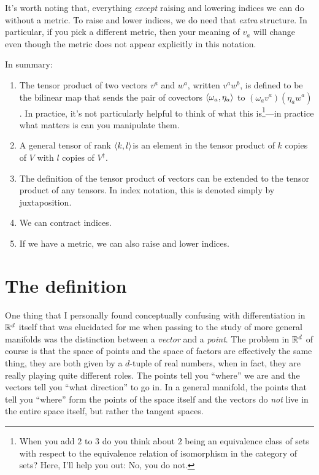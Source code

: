 It's worth noting that, everything \emph{except} raising and lowering indices we can do without a metric.  To raise and lower indices, we do need that \emph{extra} structure.  In particular, if you pick a different metric, then your meaning of $v_a$ will change even though the metric does not appear explicitly in this notation.

In summary:
\begin{enumerate}
\item The tensor product of two vectors $v^a$ and $w^a$, written $v^aw^b$, is defined to be the bilinear map that sends the pair of covectors $\langle\omega _a,\eta _a\rangle$ to $(\omega _av^a)(\eta _aw^a)$.  In practice, it's not particularly helpful to think of what this is\footnote{When you add $2$ to $3$ do you think about $2$ being an equivalence class of sets with respect to the equivalence relation of isomorphism in the category of sets?  Here, I'll help you out:  No, you do not.}---in practice what matters is can you manipulate them.
\item A general tensor of rank $\langle k,l\rangle$is an element in the tensor product of $k$ copies of $V$ with $l$ copies of $V^{\dagger}$.
\item The definition of the tensor product of vectors can be extended to the tensor product of any tensors.  In index notation, this is denoted simply by juxtaposition.
\item We can contract indices.
\item If we have a metric, we can also raise and lower indices.
\end{enumerate}

\section{The definition}

One thing that I personally found conceptually confusing with differentiation in $\mathbb{R} ^d$ itself that was elucidated for me when passing to the study of more general manifolds was the distinction between a \emph{vector} and a \emph{point}.  The problem in $\mathbb{R} ^d$ of course is that the space of points and the space of factors are effectively the same thing, they are both given by a $d$-tuple of real numbers, when in fact, they are really playing quite different roles.  The points tell you ``where'' we are and the vectors tell you ``what direction'' to go in.  In a general manifold, the points that tell you ``where'' form the points of the space itself and the vectors do \emph{not} live in the entire space itself, but rather the tangent spaces.

